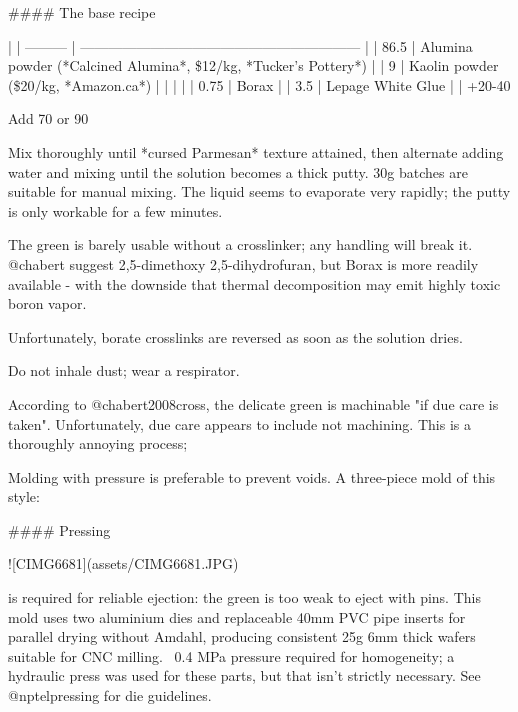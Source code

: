 \documentclass[fleqn,10pt]{article}
\begin{document}
#### The base recipe

| %
| --------- | ------------------------------------------------------------ |
| 86.5      | Alumina powder (*Calcined Alumina*, \$12/kg, *Tucker's Pottery*) |
| 9         | Kaolin powder (\$20/kg, *Amazon.ca*)                         |
|           |                                                              |
| 0.75      | Borax                                                        |
| 3.5       | Lepage White Glue                                            |
| +20-40%



Add 70 or 90%

Mix thoroughly until *cursed Parmesan* texture attained, then alternate adding water and mixing until the solution becomes a thick putty. 30g batches are suitable for manual mixing. The liquid seems to evaporate very rapidly; the putty is only workable for a few minutes.

The green is barely usable without a crosslinker; any handling will break it. @chabert suggest 2,5-dimethoxy 2,5-dihydrofuran, but Borax is more readily available - with the downside that thermal decomposition may emit highly toxic boron vapor.

Unfortunately, borate crosslinks are reversed as soon as the solution dries.



Do not inhale dust; wear a respirator.

According to @chabert2008cross, the delicate green is machinable "if due care is taken". Unfortunately, due care appears to include not machining. This is a thoroughly annoying process; 

Molding with pressure is preferable to prevent voids. A three-piece mold of this style:

#### Pressing

![CIMG6681](assets/CIMG6681.JPG)

is required for reliable ejection: the green is too weak to eject with pins. This mold uses two aluminium dies and replaceable 40mm PVC pipe inserts for parallel drying without Amdahl, producing consistent 25g 6mm thick wafers suitable for CNC milling. ~0.4 MPa pressure required for homogeneity; a hydraulic press was used for these parts, but that isn't strictly necessary. See @nptelpressing for die guidelines.
\end{document}
